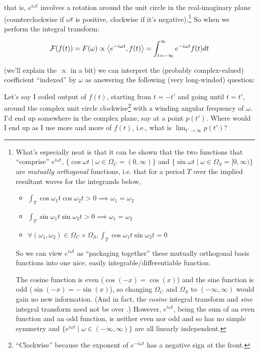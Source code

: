 \documentclass[../main/main.tex]{subfiles}
\begin{document}
that is, \(e^{i\omega t}\) involves a rotation around 
the unit circle in the real-imaginary plane 
(counterclockwise if \(\omega t\) is positive,
clockwise if it's negative).\footnote
{
  What's especially neat is
  that it can be shown that the two functions that ``comprise''
  \(e^{i\omega t}\), 
  \(\{\cos{\omega t} \mid \omega \in \Omega_{C} = (0, \infty) \}\) and 
  \(\{\sin{\omega t} \mid \omega \in \Omega_{S} = [0, \infty) \}\) are 
  \emph{mutually orthogonal} functions, i.e. that
  for a period \(T\) over the implied resultant waves
  for the integrands below,
  \begin{itemize}
    \item
      \(\int_{T}\cos{\omega_1t}\cos{\omega_2t} > 0 \implies \omega_1 = \omega_2\)
    \item
      \(\int_{T}\sin{\omega_1t}\sin{\omega_2t} > 0 \implies \omega_1 = \omega_2\)
    \item
    \(\forall 
      (\omega_1, \omega_2) \in \Omega_{C} \times \Omega_{S}, 
    \int_{T}\cos{\omega_1t}\sin{\omega_2t} = 0 \)
  \end{itemize}
  So we can view \(e^{i\omega t}\) as ``packaging together''
  these mutually orthogonal basis functions into one nice,
  easily integrable/differentiable function.\par

  The cosine function is even (\(\cos(-x) = \cos(x)\)) and
  the sine function is odd (\(\sin(-x) = -\sin(x)\)), so
  changing \(\Omega_{C}\) and \(\Omega_{S}\) to 
  \((-\infty, \infty)\) would gain no new information.
  (And in fact, the \emph{cosine} integral transform and
  \emph{sine} integral transform need not be over .)
  However, \(e^{i\omega t}\), being the sum of an even function
  and an odd function, is neither even nor odd and so
  has no simple symmetry and
  \(\{e^{i\omega t} \mid \omega \in (-\infty, \infty)\}\)
  are all linearly independent.
}
So when we perform the integral transform:

\[\mathcal{F}(f(t)) = F(\omega) 
  \propto \left<e^{-i\omega t},f(t)\right>
  = \int_{t=-\infty}^{\infty} e^{-i\omega t} f(t) dt\]

(we'll explain the \(\propto\) in a bit)
we can interpret the (probably complex-valued) coefficient
``indexed'' by \(\omega\) as answering the following
(very long-winded) question:\par

Let's say
I coiled output of \(f(t)\), 
starting from \(t=-t'\) and going until \(t=t'\),
around the complex unit circle clockwise\footnote{
  ``Clockwise'' because the exponent of \(e^{-i\omega t}\)
  has a negative sign at the front.
}
with a winding angular frequency of \(\omega\). I'd end
up somewhere in the complex plane, say at a point \(p(t')\).
Where would I end up as I use more and more of
\(f(t)\), i.e., what is \(\lim_{t' \rightarrow \infty} p(t')\)?
\par
\end{document}
